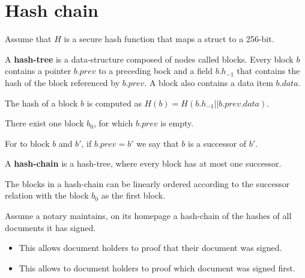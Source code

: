 
\section{Hash chain}

Assume that $H$ is a secure hash function that maps a struct to a 256-bit.

\begin{definition}
A \textbf{hash-tree} is a data-structure composed of nodes called blocks. 
Every block $b$ contains a pointer $b.prev$ to a preceding bock and a field $b.h_{-1}$ 
that contains the hash of the block referenced by $b.prev$.
A block also contains a data item $b.data$.

The hash of a block $b$ is computed as $H(b)= H(b.h_{-1} || b.prev.data)$.

There exist one block $b_0$, for which $b.prev$ is empty.

For to block $b$ and $b'$, if $b.prev=b'$ we say that $b$ is a successor of $b'$.

A \textbf{hash-chain} is a hash-tree, where every block has at most one successor.
\end{definition}


\begin{lem}
The blocks in a hash-chain can be linearly ordered according to the successor relation with the block $b_0$ as the first block.
\end{lem}


\begin{example}
Assume a notary maintains, on its homepage a hash-chain of the hashes of all documents it has signed. 
\begin{itemize}
	\item This allows document holders to proof that their document was signed.
	\item This allows to document holders to proof which document was signed first.
\end{itemize}
\end{example}